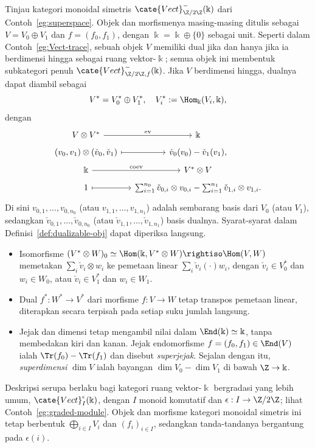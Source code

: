 \begin{example}\label{eg:superVect-trace}
	Tinjau kategori monoidal simetris
	$\cate{Vect}^-_{\Z/2\Z}(\Bbbk)$ dari Contoh~\ref{eg:superspace}.
	Objek dan morfismenya masing-masing ditulis sebagai
	$V=V_0\oplus V_1$ dan $f=(f_0,f_1)$, dengan
	$\Bbbk=\Bbbk\oplus\{0\}$ sebagai unit. Seperti dalam
	Contoh~\ref{eg:Vect-trace}, sebuah objek $V$ memiliki dual jika dan
	hanya jika ia berdimensi hingga sebagai ruang vektor-$\Bbbk$; semua
	objek ini membentuk subkategori penuh
	$\cate{Vect}^-_{\Z/2\Z, f}(\Bbbk)$. Jika $V$ berdimensi hingga, dualnya
	dapat diambil sebagai
	\[ V^* = V^*_0 \oplus V^*_1, \quad V^*_i := \Hom_{\Bbbk}(V_i, \Bbbk), \]
	dengan
	\[\begin{tikzcd}[row sep=tiny, column sep=small]
		V \otimes V^* \arrow[r, "{\mathrm{ev}}"] & \Bbbk \\
		(v_0, v_1) \otimes (\check{v}_0, \check{v}_1) \arrow[mapsto, r] & \check{v}_0(v_0) - \check{v}_1(v_1), \\
		\Bbbk \arrow[r, "{\mathrm{coev}}"] & V^* \otimes V \\
		1 \arrow[mapsto, r] & \sum_{i=1}^{n_0} \check{v}_{0,i} \otimes v_{0,i} - \sum_{i=1}^{n_1} \check{v}_{1,i} \otimes v_{1,i}.
	\end{tikzcd}\]
	Di sini $v_{0,1},\ldots,v_{0,n_0}$ (atau
	$v_{1,1},\ldots,v_{1,n_1}$) adalah sembarang basis dari $V_0$ (atau
	$V_1$), sedangkan $\check v_{0,1},\ldots,\check v_{0,n_0}$ (atau
	$\check v_{1,1},\ldots,\check v_{1,n_1}$) basis dualnya. Syarat-syarat
	dalam Definisi~\ref{def:dualizable-obj} dapat diperiksa langsung.
	\begin{itemize}
		\item Isomorfisme
		$(V^*\otimes W)_0\simeq\Hom(\Bbbk,V^*\otimes W)
		\rightiso\Hom(V,W)$ memetakan $\sum_i\check v_i\otimes w_i$ ke
		pemetaan linear $\sum_i\check v_i(\mathord\cdot)w_i$, dengan
		$\check v_i\in V_0^*$ dan $w_i\in W_0$, atau
		$\check v_i\in V_1^*$ dan $w_i\in W_1$.
		\item Dual $f^*:W^*\to V^*$ dari morfisme $f:V\to W$ tetap
		transpos pemetaan linear, diterapkan secara terpisah pada setiap suku
		jumlah langsung.
		\item Jejak dan dimensi tetap mengambil nilai dalam
		$\End(\Bbbk)\simeq\Bbbk$, tanpa membedakan kiri dan kanan. Jejak
		endomorfisme $f=(f_0,f_1)\in\End(V)$ ialah
		$\Tr(f_0)-\Tr(f_1)$ dan disebut \emph{superjejak}. Sejalan dengan itu,
		\emph{superdimensi} $\dim V$ ialah bayangan
		$\dim V_0-\dim V_1$ di bawah $\Z\to\Bbbk$.
	\end{itemize}

	Deskripsi serupa berlaku bagi kategori ruang vektor-$\Bbbk$ bergradasi
	yang lebih umum, $\cate{Vect}^{\epsilon}_I(\Bbbk)$, dengan $I$ monoid
	komutatif dan $\epsilon:I\to\Z/2\Z$; lihat
	Contoh~\ref{eg:graded-module}. Objek dan morfisme kategori monoidal
	simetris ini tetap berbentuk $\bigoplus_{i\in I}V_i$ dan
	$(f_i)_{i\in I}$, sedangkan tanda-tandanya bergantung pada $\epsilon(i)$.
\end{example}

